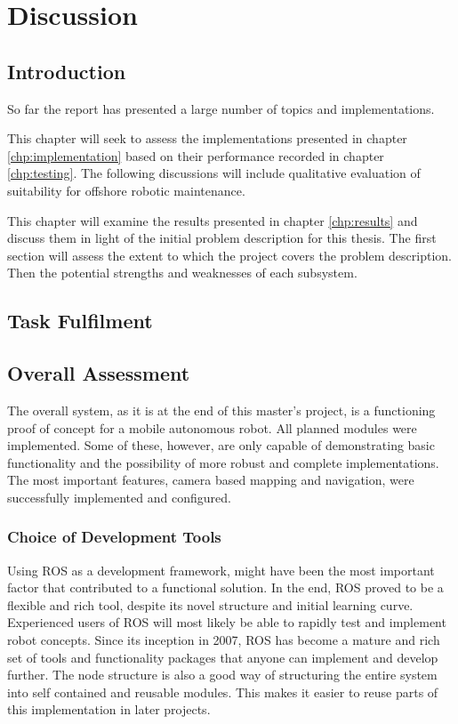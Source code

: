 \chapter{Discussion}
\label{chp:discussion} 

\section{Introduction}

So far the report has presented a large number of topics and implementations.

This chapter will seek to assess the implementations presented in chapter \ref{chp:implementation} based on their performance recorded in chapter \ref{chp:testing}. The following discussions will include qualitative evaluation of suitability for offshore robotic maintenance.

This chapter will examine the results presented in chapter \ref{chp:results} and discuss them in light of the initial problem description for this thesis. The first section will assess the extent to which the project covers the problem description. Then the potential strengths and weaknesses of each subsystem.


\section{Task Fulfilment}



\section{Overall Assessment}

The overall system, as it is at the end of this master's project, is a functioning proof of concept for a mobile autonomous robot. All planned modules were implemented. Some of these, however, are only capable of demonstrating basic functionality and the possibility of more robust and complete implementations. The most important features, camera based mapping and navigation, were successfully implemented and configured. 

\subsection{Choice of Development Tools}

Using \ac{ROS} as a development framework, might have been the most important factor that contributed to a functional solution. In the end, \ac{ROS} proved to be a flexible and rich tool, despite its novel structure and initial learning curve. Experienced users of \ac{ROS} will most likely be able to rapidly test and implement robot concepts.  Since its inception in 2007, \ac{ROS} has become a mature and rich set of tools and functionality packages that anyone can implement and develop further. The node structure is also a good way of structuring the entire system into self contained and reusable modules. This makes it easier to reuse parts of this implementation in later projects.

